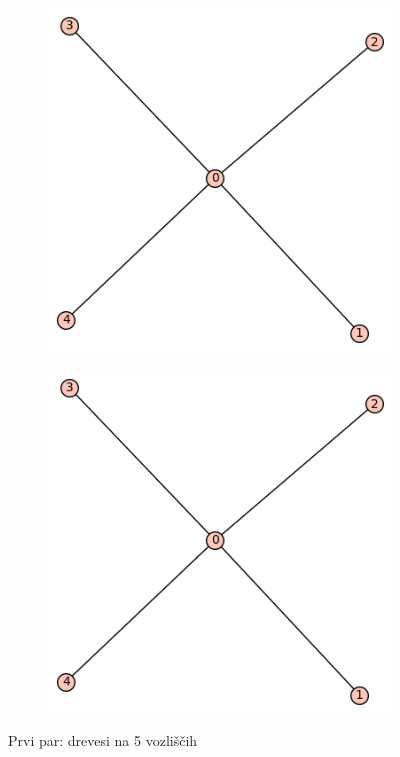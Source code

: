 \documentclass[12pt, a4paper]{article}
\begin{document}
\begin{center}
\begin{center}
\begin{figure}[!htb]
\centering
\begin{subfigure}{0.5\textwidth}
  \centering
  \includegraphics[width=0.4\linewidth]{t-7}
\end{subfigure}%
\begin{subfigure}{0.5\textwidth}
  \centering
  \includegraphics[width=0.5\linewidth]{t-7}
\end{subfigure}
\caption{Prvi par: drevesi na 5 vozliščih}
\label{fig:test}
\end{figure}
\end{center}

\pagebreak


\end{center}
\end{document}
